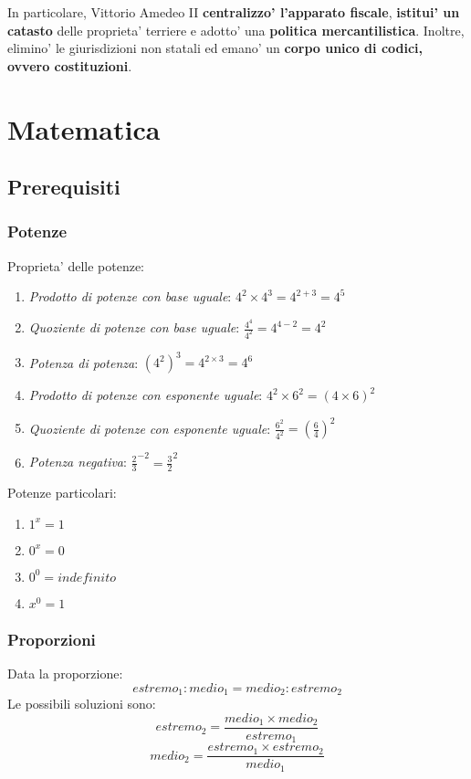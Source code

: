 \documentclass{article}
\begin{document}
{{    In particolare, Vittorio Amedeo II \textbf{centralizzo' l'apparato fiscale}, \textbf{istitui' un catasto} delle proprieta' terriere e adotto' una \textbf{politica mercantilistica}. Inoltre, elimino' le giurisdizioni non statali ed emano' un \textbf{corpo unico di codici, ovvero costituzioni}.
  }

  \pagebreak
  \section{Matematica}
  {
    \subsection{Prerequisiti}
    \subsubsection{Potenze}
    Proprieta' delle potenze:
    \begin{enumerate}
      \item \textit{Prodotto di potenze con base uguale}: $ 4^2 \times 4^3 = 4^{2 + 3} = 4^5 $
      \item \textit{Quoziente di potenze con base uguale}: $ \frac{4^4}{4^2} = 4^{4 - 2} = 4^2 $
      \item \textit{Potenza di potenza}: $ (4^2)^3 = 4^{2 \times 3} = 4^6 $
      \item \textit{Prodotto di potenze con esponente uguale}: $ 4^2 \times 6^2 = (4 \times 6)^2 $
      \item \textit{Quoziente di potenze con esponente uguale}: $ \frac{6^2}{4^2} = (\frac{6}{4})^2 $
      \item \textit{Potenza negativa}: $ \frac{2}{3}^{-2} = \frac{3}{2}^2 $
    \end{enumerate}

    Potenze particolari:
    \begin{enumerate}
      \item $ 1^x = 1 $
      \item $ 0^x = 0 $
      \item $ 0^0 = indefinito $
      \item $ x^0 = 1 $
    \end{enumerate}

    \subsubsection{Proporzioni}
    Data la proporzione:
    $$ estremo_1 : medio_1 = medio_2 : estremo_2 $$
    Le possibili soluzioni sono:
    $$ estremo_2 = \frac{medio_1 \times medio_2}{estremo_1}$$
    $$ medio_2 = \frac{estremo_1 \times estremo_2}{medio_1} $$

}}
\end{document}
